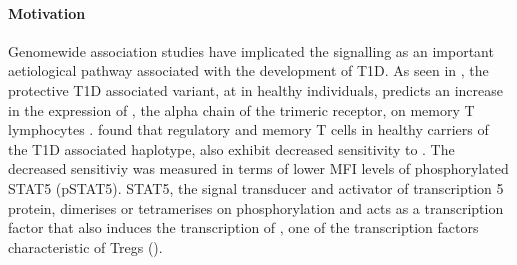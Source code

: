 \paragraph{Motivation}
Genomewide association studies have implicated the  signalling as an important aetiological pathway associated with the development of \gls{T1D}.  
As seen in , the protective T1D associated  variant, at  in healthy individuals, predicts an increase in the expression of ,
the alpha chain of the trimeric  receptor, on memory \positive T lymphocytes \citep{Dendrou:2008gc,Dendrou:2009dv}.
\citet{Garg:2012jr} found that regulatory and memory \positive T cells in healthy carriers of the T1D associated  haplotype,
also exhibit decreased sensitivity to .
The decreased sensitiviy was measured in terms of lower MFI levels of phosphorylated STAT5 (pSTAT5).
STAT5, the signal transducer and activator of transcription 5 protein, dimerises or tetramerises on phosphorylation and acts as a transcription factor that also induces the transcription of , one of the transcription factors characteristic of \glspl{Treg} ().

